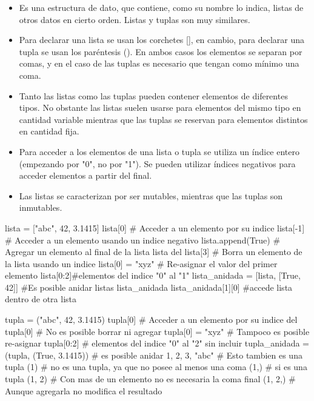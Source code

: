 \begin{itemize}

\item Es una estructura de dato, que contiene, como su nombre lo indica, listas de otros datos en cierto orden. Listas y tuplas son muy similares.

\item Para declarar una lista se usan los corchetes [], en cambio, para declarar una tupla se usan los paréntesis (). En ambos casos los elementos se separan por comas, y en el caso de las tuplas es necesario que tengan como mínimo una coma.

\item    Tanto las listas como las tuplas pueden contener elementos de diferentes tipos. No obstante las listas suelen usarse para elementos del mismo tipo en cantidad variable mientras que las tuplas se reservan para elementos distintos en cantidad fija.
    
\item Para acceder a los elementos de una lista o tupla se utiliza un índice entero (empezando por "0", no por "1"). Se pueden utilizar índices negativos para acceder elementos a partir del final.


\item Las listas se caracterizan por ser mutables, mientras que las tuplas son inmutables.

\end{itemize}






\begin{pyconsole}
lista = ["abc", 42, 3.1415]
lista[0] # Acceder a un elemento por su indice
lista[-1] # Acceder a un elemento usando un indice negativo
lista.append(True) # Agregar un elemento al final de la lista
lista
del lista[3] # Borra un elemento de la lista usando un indice
lista[0] = "xyz" # Re-asignar el valor del primer elemento
lista[0:2]#elementos del indice "0" al "1" 
lista_anidada = [lista, [True, 42]] #Es posible anidar listas
lista_anidada
lista_anidada[1][0] #accede lista dentro de otra lista
\end{pyconsole}

\begin{pyconsole}
tupla = ("abc", 42, 3.1415)
tupla[0] # Acceder a un elemento por su indice
del tupla[0] # No es posible borrar ni agregar
tupla[0] = "xyz" # Tampoco es posible re-asignar
tupla[0:2] # elementos del indice "0" al "2" sin incluir
tupla_anidada = (tupla, (True, 3.1415)) # es posible anidar
1, 2, 3, "abc" # Esto tambien es una tupla
(1) #  no es una tupla, ya que no posee al menos una coma
(1,) # si es una tupla
(1, 2) # Con mas de un elemento no es necesaria la coma final
(1, 2,) # Aunque agregarla no modifica el resultado
\end{pyconsole}

